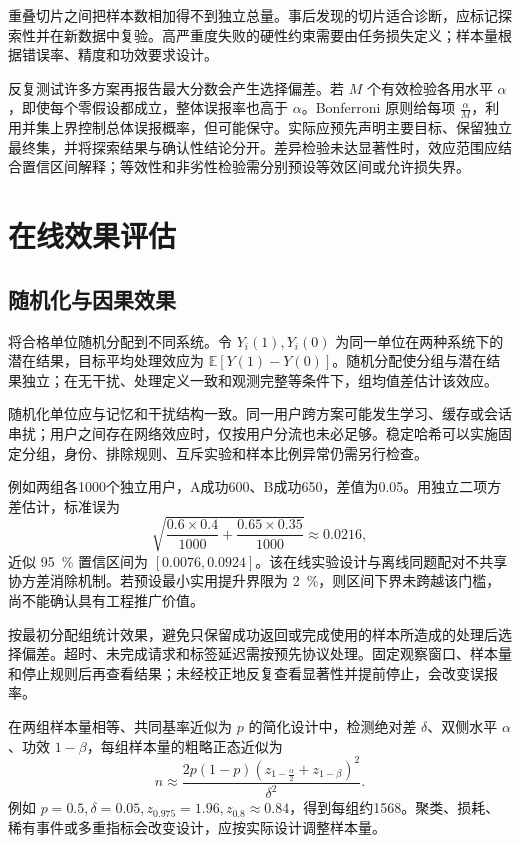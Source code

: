 \documentclass[../textbook.tex]{subfiles}
\begin{document}
重叠切片之间把样本数相加得不到独立总量。事后发现的切片适合诊断，应标记探索性并在新数据中复验。高严重度失败的硬性约束需要由任务损失定义；样本量根据错误率、精度和功效要求设计。

反复测试许多方案再报告最大分数会产生选择偏差。若 $M$ 个有效检验各用水平 $\alpha$，即使每个零假设都成立，整体误报率也高于 $\alpha$。Bonferroni 原则给每项 $\frac{\alpha}{M}$，利用并集上界控制总体误报概率，但可能保守。实际应预先声明主要目标、保留独立最终集，并将探索结果与确认性结论分开。差异检验未达显著性时，效应范围应结合置信区间解释；等效性和非劣性检验需分别预设等效区间或允许损失界。

\section{在线效果评估}
\optional
\subsection{随机化与因果效果}
将合格单位随机分配到不同系统。令 $Y_i(1),Y_i(0)$ 为同一单位在两种系统下的潜在结果，目标平均处理效应为 $\mathbb E[Y(1)-Y(0)]$。随机分配使分组与潜在结果独立；在无干扰、处理定义一致和观测完整等条件下，组均值差估计该效应。

随机化单位应与记忆和干扰结构一致。同一用户跨方案可能发生学习、缓存或会话串扰；用户之间存在网络效应时，仅按用户分流也未必足够。稳定哈希可以实施固定分组，身份、排除规则、互斥实验和样本比例异常仍需另行检查。

例如两组各1000个独立用户，A成功600、B成功650，差值为0.05。用独立二项方差估计，标准误为
\begin{equation}
 \sqrt{\frac{0.6\times0.4}{1000}+\frac{0.65\times0.35}{1000}}\approx0.0216,
\end{equation}
近似 \qty{95}{\percent} 置信区间为 $[0.0076, 0.0924]$。该在线实验设计与离线同题配对不共享协方差消除机制。若预设最小实用提升界限为 \qty{2}{\percent}，则区间下界未跨越该门槛，尚不能确认具有工程推广价值。

按最初分配组统计效果，避免只保留成功返回或完成使用的样本所造成的处理后选择偏差。超时、未完成请求和标签延迟需按预先协议处理。固定观察窗口、样本量和停止规则后再查看结果；未经校正地反复查看显著性并提前停止，会改变误报率。

在两组样本量相等、共同基率近似为 $p$ 的简化设计中，检测绝对差 $\delta$、双侧水平 $\alpha$、功效 $1-\beta$，每组样本量的粗略正态近似为
\begin{equation}
 n\approx\frac{2p(1-p)(z_{1-\frac{\alpha}{2}}+z_{1-\beta})^2}{\delta^2}.
\end{equation}
例如 $p=0.5,\delta=0.05,z_{0.975}=1.96,z_{0.8}\approx0.84$，得到每组约1568。聚类、损耗、稀有事件或多重指标会改变设计，应按实际设计调整样本量。
\end{document}
